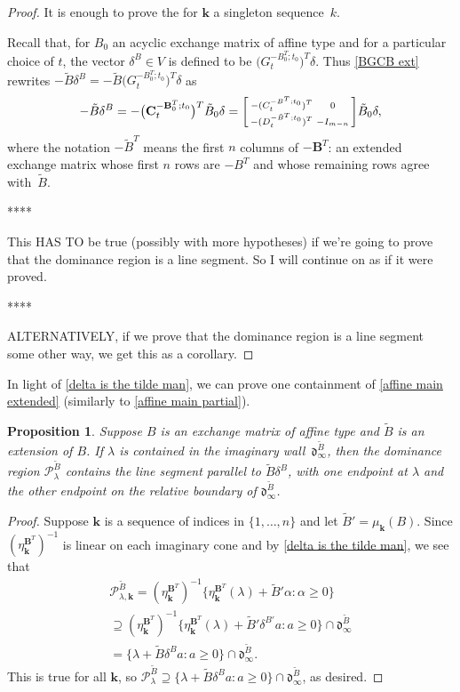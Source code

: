 \documentclass{amsart}
\newtheorem{proposition}{Proposition}[section]
\theoremstyle{definition}
\theoremstyle{remark}
\numberwithin{equation}{section}
\newcommand{\set}[1]{{\lbrace #1 \rbrace}}
\newcommand{\CC}{{\mathbf C}}
\newcommand{\0}{{\mathbf{0}}}
\newcommand{\kk}{{\boldsymbol{k}}}
\newcommand{\tB}{{\tilde{B}}}
\newcommand{\BB}{\mathbf{B}}
\renewcommand{\P}{\mathcal{P}}
\renewcommand{\d}{{\mathfrak d}}
\newcommand{\sayN}[1]{\say[N]{#1}}
\begin{document}
\begin{proof}
It is enough to prove the  for $\kk$ a singleton sequence~$k$.


Recall that, for $B_0$ an acyclic exchange matrix of affine type and for a particular choice of $t$, the vector $\delta^B\in V$ is defined to be $\bigl(G_t^{-B_0^T;t_0}\bigr)^T\delta$.
Thus \cref{BGCB ext} rewrites $-\tB\delta^B=-\tB\bigl(G_t^{-B_0^T;t_0}\bigr)^T\delta$ as 
\[-\tB\delta^B=-\bigl(\CC_t^{-\BB_0^T;t_0}\bigr)^T\tB_0\delta=\begin{bsmallmatrix}-(C_t^{-B^T;t_0})^T&0\\-(D_t^{-\tB^T;t_0})^T&-I_{m-n}\end{bsmallmatrix}\tB_0\delta,\]
where the notation $-\tB^T$ means the first $n$ columns of $-\BB^T$: an extended exchange matrix whose first $n$ rows are $-B^T$ and whose remaining rows agree with~$\tB$.  \sayN{Or, of we can get away with it, do a star.}

****

This HAS TO be true (possibly with more hypotheses) if we're going to prove that the dominance region is a line segment.
So I will continue on as if it were proved.

****

ALTERNATIVELY, if we prove that the dominance region is a line segment some other way, we get this as a corollary.


\end{proof}

In light of \cref{delta is the tilde man}, we can prove one containment of \cref{affine main extended} (similarly to \cref{affine main partial}).

\begin{proposition}\label{affine main extended partial}
Suppose $B$ is an exchange matrix of affine type and $\tB$ is an extension of $B$.
If $\lambda$ is contained in the imaginary wall~$\d^\tB_\infty$, then the dominance region $\P^\tB_\lambda$ \emph{contains} the line segment parallel to $\tB\delta^B$, with one endpoint at $\lambda$ and the other endpoint on the relative boundary of $\d^\tB_\infty$.
\end{proposition}
\begin{proof}
Suppose $\kk$ is a sequence of indices in $\set{1,\ldots,n}$ and let $\tB'=\mu_\kk(B)$.
Since $(\eta_\kk^{\BB^T})^{-1}$ is linear on each imaginary cone and by \cref{delta is the tilde man}, we see that 
\begin{multline*}
\P^\tB_{\lambda,\kk}=(\eta_\kk^{\BB^T})^{-1}\set{\eta^{\BB^T}_\kk(\lambda)+\tB'\alpha:\alpha\ge0}\\
\supseteq(\eta_\kk^{\BB^T})^{-1}\set{\eta^{\BB^T}_\kk(\lambda)+\tB'\delta^{B'}a:a\ge0}\cap\d^\tB_\infty\\
=\set{\lambda+\tB\delta^Ba:a\ge0}\cap\d^\tB_\infty. 
\end{multline*}
This is true for all $\kk$, so $\P^\tB_\lambda\supseteq\set{\lambda+\tB\delta^Ba:a\ge0}\cap\d^\tB_\infty$, as desired.
\end{proof}
\end{document}
